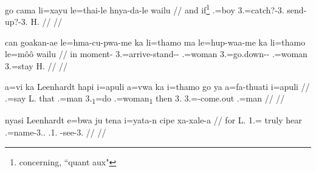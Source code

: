 \documentclass{article}
\begin{document}
\a
\begingl
\gla 
go cama li=xayu le=thai-le hnya-da-le wailu
// \glb and if\footnote{concerning, “quant aux"} .=boy 3.=catch?-3. send-up?-3. H.
// \glft {}
// \endgl

\a
\begingl
\gla 
can goakan-ae le=hma-cu-pwa-me ka li=thamo ma le=hup-waa-me ka li=thamo le=môô wailu
// \glb in moment- 3.=arrive-stand--  .=woman  3.=go.down--  .=woman 3.=stay H.
// \glft {}
// \endgl

\a
\begingl
\gla a=vi ka Leenhardt hapi i=apuli a=vwa ka i=thamo go ya a=fa-thuati i=apuli
// .=say  L. that .=man 3.\textsubscript{1}=do  .=woman\textsubscript{1} then 3. 3.=-come.out .=man
// \glft {}
// \endgl

\a
\begingl
\gla 
nyasi Leenhardt e=bwa ju tena i=yata-n cipe xa-xale-a
// \glb for L. 1.= truly hear .=name-3.. .1. -see-3.
// \glft {}
// \endgl
\xe
 
\glossingAbbrevsList
\end{document}
